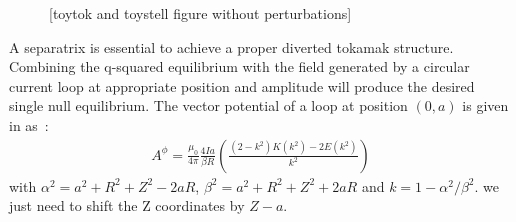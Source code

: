 \begin{figure}[h!]
    \hfill
    \hfill
    \hfill
    \caption{[toytok and toystell figure without perturbations]}
    \label{fig:toytok-toystell}
\end{figure}

A separatrix is essential to achieve a proper diverted tokamak structure. Combining the q-squared equilibrium with the field generated by a circular current loop at appropriate position and amplitude will produce the desired single null equilibrium. The vector potential of a loop at position $(0, a)$ is given in \cite{simpson_simple_2001} as~:
\begin{align*}
    A^\phi = \frac{\mu_0}{4\pi}\frac{4Ia}{\beta R}\left(\frac{(2-k^2)K(k^2)-2E(k^2)}{k^2}\right)
\end{align*}
with $\alpha^2 = a^2 + R^2 + Z^2 - 2aR$, $\beta^2 = a^2+R^2+Z^2+2aR$ and $k = 1 - \alpha^2/\beta^2$. we just need to shift the Z coordinates by $Z-a$.

